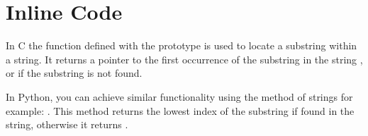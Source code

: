 \section{Inline Code}
In C the  function defined with the prototype
{\ttfamily {}      } is
used to locate a substring within a string. It returns a pointer to the first occurrence of the substring
 in the string , or  if the substring is not found.

In Python, you can achieve similar functionality using the  method of strings for example: {\ttfamily {}   }. This method returns the lowest index of the substring if found in the string, otherwise it returns .

